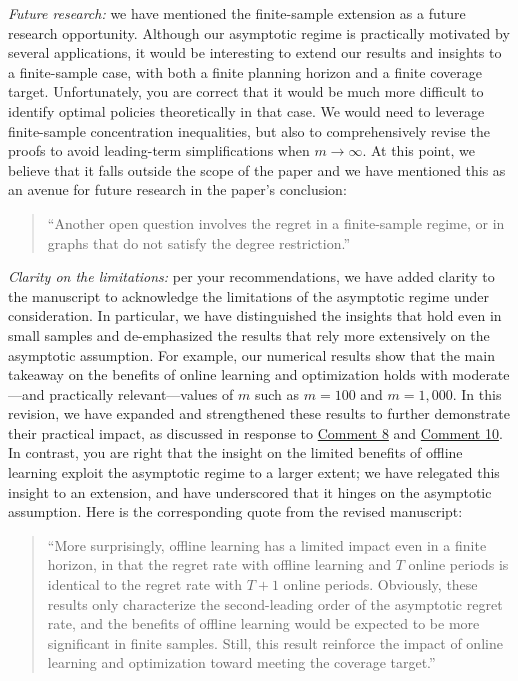 \documentclass[11pt]{article}
\begin{document}
\textit{Future research:} we have mentioned the finite-sample extension as a future research opportunity. Although our asymptotic regime is practically motivated by several applications, it would be interesting to extend our results and insights to a finite-sample case, with both a finite planning horizon and a finite coverage target. Unfortunately, you are correct that it would be much more difficult to identify optimal policies theoretically in that case. We would need to leverage finite-sample concentration inequalities, but also to comprehensively revise the proofs to avoid leading-term simplifications when $m\to\infty$. At this point, we believe that it falls outside the scope of the paper and we have mentioned this as an avenue for future research in the paper's conclusion:
\begin{quote}
    ``Another open question involves the regret in a finite-sample regime, or in graphs that do not satisfy the degree restriction.''
\end{quote}

\textit{Clarity on the limitations:} per your recommendations, we have added clarity to the manuscript to acknowledge the limitations of the asymptotic regime under consideration. In particular, we have distinguished the insights that hold even in small samples and de-emphasized the results that rely more extensively on the asymptotic assumption. For example, our numerical results show that the main takeaway on the benefits of online learning and optimization holds with moderate---and practically relevant---values of $m$ such as $m=100$ and $m=1,000$. In this revision, we have expanded and strengthened these results to further demonstrate their practical impact, as discussed in response to \hyperref[R1:8]{\color{blue}Comment 8} and \hyperref[R1:10]{\color{blue}Comment 10}. In contrast, you are right that the insight on the limited benefits of offline learning exploit the asymptotic regime to a larger extent; we have relegated this insight to an extension, and have underscored that it hinges on the asymptotic assumption. Here is the corresponding quote from the revised manuscript:
\begin{quote}
    ``More surprisingly, offline learning has a limited impact even in a finite horizon, in that the regret rate with offline learning and $T$ online periods is identical to the regret rate with $T+1$ online periods. Obviously, these results only characterize the second-leading order of the asymptotic regret rate, and the benefits of offline learning would be expected to be more significant in finite samples. Still, this result reinforce the impact of online learning and optimization toward meeting the coverage target.''
\end{quote}
\end{document}
